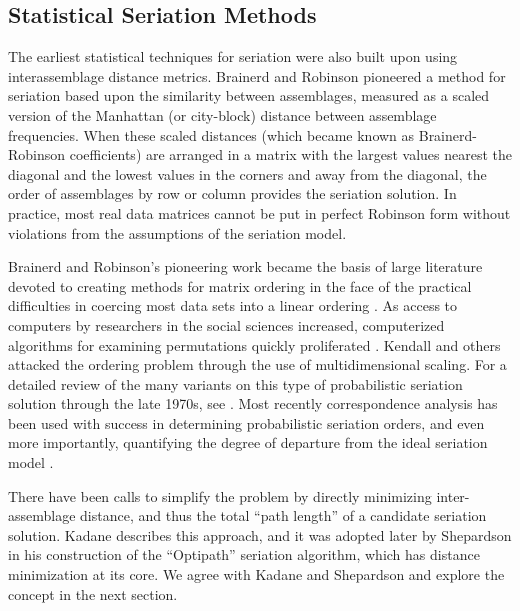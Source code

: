 \subsection{Statistical Seriation
Methods}\label{multser:sec:statistical-seriation-methods}

The earliest statistical techniques for seriation were also built upon
using interassemblage distance metrics. Brainerd \citeyearpar{Brainerd1951} and Robinson
\citeyearpar{Robinson1951} pioneered a method for seriation
based upon the similarity between assemblages, measured as a scaled
version of the Manhattan (or city-block) distance between assemblage
frequencies. When these scaled distances (which became known as
Brainerd-Robinson coefficients) are arranged in a matrix with the
largest values nearest the diagonal and the lowest values in the corners
and away from the diagonal, the order of assemblages by row or column
provides the seriation solution. In practice, most real data matrices
cannot be put in perfect Robinson form without violations from the
assumptions of the seriation model.

Brainerd and Robinson's pioneering work became the basis of large literature
devoted to creating methods for matrix ordering in the face of the
practical difficulties in coercing most data sets into a linear
ordering
\citep[e.g.,][]{dempsey1963statistical, Kendall1963, Matthews1963, Bordaz1970aa, Gardin1970, Kendall1970, Kendall1971}.
As access to computers by researchers in the social sciences increased,
computerized algorithms for examining permutations quickly proliferated
\citep{Ascher1963, craytor1968refinements, Kuzara1966}. Kendall
\citeyearpar{Kendall1969} and others attacked the ordering problem
through the use of multidimensional scaling. For a detailed review of
the many variants on this type of probabilistic seriation solution
through the late 1970s, see \citep{Marquardt:1978aa}. Most recently
correspondence analysis has been used with success in determining
probabilistic seriation orders, and even more importantly, quantifying the
degree of departure from the ideal seriation model \citep{Smith2005}.

There have been calls to simplify
the problem by directly minimizing inter-assemblage distance, and thus
the total ``path length'' of a candidate seriation solution.  Kadane
\citeyearpar{Kadane1971} describes this approach, and it was adopted
later by Shepardson \citeyearpar{shepardson2006} in his construction of
the ``Optipath'' seriation algorithm, which has distance minimization at
its core.  We agree with Kadane and Shepardson and explore the concept in the next section.

